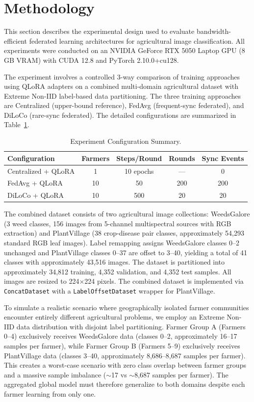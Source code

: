 \documentclass[conference, compsoc, twoside]{IEEEtran}
\begin{document}
\section{Methodology}

This section describes the experimental design used to evaluate bandwidth-efficient federated learning architectures for agricultural image classification. All experiments were conducted on an NVIDIA GeForce RTX 5050 Laptop GPU (8 GB VRAM) with CUDA 12.8 and PyTorch 2.10.0+cu128.

The experiment involves a controlled 3-way comparison of training approaches using QLoRA adapters on a combined multi-domain agricultural dataset with Extreme Non-IID label-based data partitioning. The three training approaches are Centralized (upper-bound reference), FedAvg (frequent-sync federated), and DiLoCo (rare-sync federated). The detailed configurations are summarized in Table~\ref{tab:experiment_config}.

\begin{table}[ht]
\centering
\caption{Experiment Configuration Summary. \medskip}
\label{tab:experiment_config}
\small
\begin{tabular}{ l  c  c  c  c }
\hline
Configuration & Farmers & Steps/Round & Rounds & Sync Events \\
\hline
Centralized + QLoRA & 1 & 10 epochs & --- & 0 \\
FedAvg + QLoRA & 10 & 50 & 200 & 200 \\
DiLoCo + QLoRA & 10 & 500 & 20 & 20 \\
\hline
\end{tabular}
\end{table}

The combined dataset consists of two agricultural image collections: WeedsGalore (3 weed classes, 156 images from 5-channel multispectral sources with RGB extraction) and PlantVillage (38 crop-disease pair classes, approximately 54,293 standard RGB leaf images). Label remapping assigns WeedsGalore classes 0--2 unchanged and PlantVillage classes 0--37 are offset to 3--40, yielding a total of 41 classes with approximately 43,516 images. The dataset is partitioned into approximately 34,812 training, 4,352 validation, and 4,352 test samples. All images are resized to 224$\times$224 pixels. The combined dataset is implemented via \texttt{ConcatDataset} with a \texttt{LabelOffsetDataset} wrapper for PlantVillage.

To simulate a realistic scenario where geographically isolated farmer communities encounter entirely different agricultural problems, we employ an Extreme Non-IID data distribution with disjoint label partitioning. Farmer Group A (Farmers 0--4) exclusively receives WeedsGalore data (classes 0--2, approximately 16--17 samples per farmer), while Farmer Group B (Farmers 5--9) exclusively receives PlantVillage data (classes 3--40, approximately 8,686--8,687 samples per farmer). This creates a worst-case scenario with zero class overlap between farmer groups and a massive sample imbalance ($\sim$17 vs $\sim$8,687 samples per farmer). The aggregated global model must therefore generalize to both domains despite each farmer learning from only one.
\end{document}
